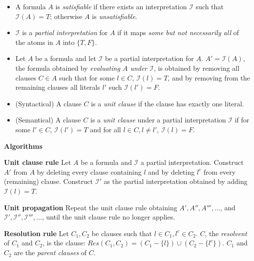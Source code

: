 \documentclass[11pt]{report}
\begin{document}
\begin{itemize}
\item A formula $A$ is \emph{satisfiable} if there exists an
interpretation $\mathcal{I}$ such that $\mathcal{I}(A)=T$; otherwise $A$
is \emph{unsatisfiable}.

\item $\mathcal{I}$ is a \emph{partial interpretation} for $A$ if it
maps \emph{some but not necessarily all} of the atoms in $A$ into
$\{T,F\}$.

\item Let $A$ be a formula and let $\mathcal{I}$ be a partial
interpretation for $A$. $A'=\mathcal{I}(A)$, the formula obtained by
\emph{evaluating $A$ under $\mathcal{I}$}, is obtained by removing all
clauses $C\in A$ such that for some $l\in C$, $\mathcal{I}(l)=T$, and by
removing from the remaining clauses all literals $l'$ such
$\mathcal{I}(l')=F$.

\item (Syntactical) A clause $C$ is a \emph{unit clause} if the clause
has exactly one literal.

\item (Semantical) A clause $C$ is a \emph{unit clause} under a partial
interpretation $\mathcal{I}$ if for some $l'\in C$, $\mathcal{I}(l')=T$
and for all $l\in C, l\neq l'$, $\mathcal{I}(l)=F$.

\end{itemize}

\bigskip

\begin{center}
\textbf{Algorithms}
\end{center}

\textbf{Unit clause rule} Let $A$ be a formula and $\mathcal{I}$ a
partial interpretation. Construct $A'$ from $A$ by deleting every clause
containing $l$ and by deleting $l^{c}$ from every (remaining) clause.
Construct $\mathcal{I}'$ as the partial interpretation obtained by
adding $\mathcal{I}(l)=T$.

\textbf{Unit propagation} Repeat the unit clause rule obtaining $A',
A'', A''', \ldots$, and
$\mathcal{I}',\mathcal{I}'',\mathcal{I}''',\ldots$, until the unit
clause rule no longer applies.

\textbf{Resolution rule}
Let $C_{1},C_{2}$ be clauses such that $l\in C_{1},l^{c}\in C_{2}$. $C$,
the \emph{resolvent} of $C_{1}$ and $C_{2}$, is the clause:
$Res(C_{1},C_{2})=(C_{1}-\{l\})  \cup (C_{2}-\{l^{c}\})$.
$C_{1}$ and $C_{2}$ are the \emph{parent clauses} of $C$.

\bigskip
\end{document}
